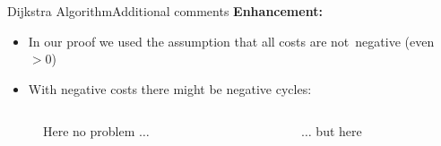 
\begin{frame}{Dijkstra Algorithm}{Additional comments}
  \textbf{Enhancement:}
  \begin{itemize}
    \item
      In our proof we used the assumption that all costs are
      {\color{MainA}not~negative} (even $> 0$)
    \item
      With {\color{MainA}negative costs} there might be
      {\color{MainA}negative cycles}:
  \end{itemize}
  \begin{columns}
    \begin{column}{0.4\linewidth}
      \begin{figure}[!h]
        \begin{adjustbox}{width=0.7\linewidth}
          
        \end{adjustbox}
        \caption{Here no problem $\ldots$}
      \end{figure}
    \end{column}
    \begin{column}{0.4\linewidth}
      \begin{figure}[!h]
        \begin{adjustbox}{width=0.7\linewidth}
          \def\DijkstraNegativeCycle{0}%
          
        \end{adjustbox}
        \caption{$\ldots$ but here}
      \end{figure}
    \end{column}
  \end{columns}
\end{frame}


